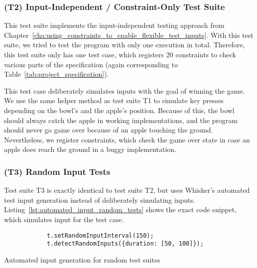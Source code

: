 \subsubsection{(T2) Input-Independent / Constraint-Only Test Suite}

This test suite implements the input-independent testing approach from Chapter~\ref{cha:using_constraints_to_enable_flexible_test_inputs}.
With this test suite, we tried to test the program with only one execution in total.
Therefore, this test suite only has one test case, which registers 20 constraints to check various parts of the specification
(again corresponding to Table~\ref{tab:project_specification}).
\parspace

This test case deliberately simulates inputs with the goal of winning the game.
We use the same helper method as test suite T1 to simulate key presses depending on the bowl's and the apple's position.
Because of this, the bowl should always catch the apple in working implementations,
and the program should never go game over because of an apple touching the ground.
Nevertheless, we register constraints, which check the game over state in case an apple does reach the ground in a buggy implementation.

\subsubsection{(T3) Random Input Tests}

Test suite T3 is exactly identical to test suite T2,
but uses Whisker's automated test input generation instead of deliberately simulating inputs.
Listing~\ref{lst:automated_input_random_tests} shows the exact code snippet, which simulates input for the test case.
\parspace

\begin{listing}[ht]
    \centering
    \begin{minipage}{.45\textwidth}
        \begin{verbatim}
            t.setRandomInputInterval(150);
            t.detectRandomInputs({duration: [50, 100]});
        \end{verbatim}
    \end{minipage}
    \caption{Automated input generation for random test suites}
    \label{lst:automated_input_random_tests}
\end{listing}

